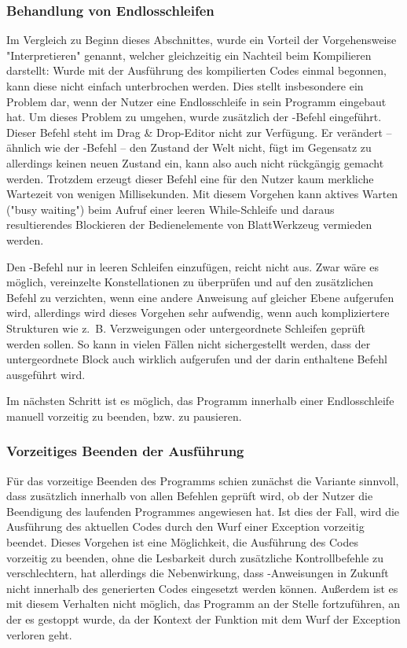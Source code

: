 \subsubsection{Behandlung von Endlosschleifen}

Im Vergleich zu Beginn dieses Abschnittes, wurde ein Vorteil der Vorgehensweise "Interpretieren" genannt, welcher gleichzeitig ein Nachteil beim Kompilieren darstellt: Wurde mit der Ausführung des kompilierten Codes einmal begonnen, kann diese nicht einfach unterbrochen werden. Dies stellt insbesondere ein Problem dar, wenn der Nutzer eine Endlosschleife in sein Programm eingebaut hat. Um dieses Problem zu umgehen, wurde zusätzlich der -Befehl eingeführt. Dieser Befehl steht im Drag \& Drop-Editor nicht zur Verfügung. Er verändert -- ähnlich wie der -Befehl -- den Zustand der Welt nicht, fügt im Gegensatz zu  allerdings keinen neuen Zustand ein, kann also auch nicht rückgängig gemacht werden. Trotzdem erzeugt dieser Befehl eine für den Nutzer kaum merkliche Wartezeit von wenigen Millisekunden. Mit diesem Vorgehen kann aktives Warten ("busy waiting") beim Aufruf einer leeren While-Schleife und daraus resultierendes Blockieren der Bedienelemente von BlattWerkzeug vermieden werden.

Den -Befehl nur in leeren Schleifen einzufügen, reicht nicht aus. Zwar wäre es möglich, vereinzelte Konstellationen zu überprüfen und auf den zusätzlichen Befehl zu verzichten, wenn eine andere Anweisung auf gleicher Ebene aufgerufen wird, allerdings wird dieses Vorgehen sehr aufwendig, wenn auch kompliziertere Strukturen wie z.~B. Verzweigungen oder untergeordnete Schleifen geprüft werden sollen. So kann in vielen Fällen nicht sichergestellt werden, dass der untergeordnete Block auch wirklich aufgerufen und der darin enthaltene Befehl ausgeführt wird.

Im nächsten Schritt ist es möglich, das Programm innerhalb einer Endlosschleife manuell vorzeitig zu beenden, bzw. zu pausieren.

\subsubsection{Vorzeitiges Beenden der Ausführung}

Für das vorzeitige Beenden des Programms schien zunächst die Variante sinnvoll, dass zusätzlich innerhalb von allen Befehlen geprüft wird, ob der Nutzer die Beendigung des laufenden Programmes angewiesen hat. Ist dies der Fall, wird die Ausführung des aktuellen Codes durch den Wurf einer Exception vorzeitig beendet. Dieses Vorgehen ist eine Möglichkeit, die Ausführung des Codes vorzeitig zu beenden, ohne die Lesbarkeit durch zusätzliche Kontrollbefehle zu verschlechtern, hat allerdings die Nebenwirkung, dass -Anweisungen in Zukunft nicht innerhalb des generierten Codes eingesetzt werden können. Außerdem ist es mit diesem Verhalten nicht möglich, das Programm an der Stelle fortzuführen, an der es gestoppt wurde, da der Kontext der Funktion mit dem Wurf der Exception verloren geht.

